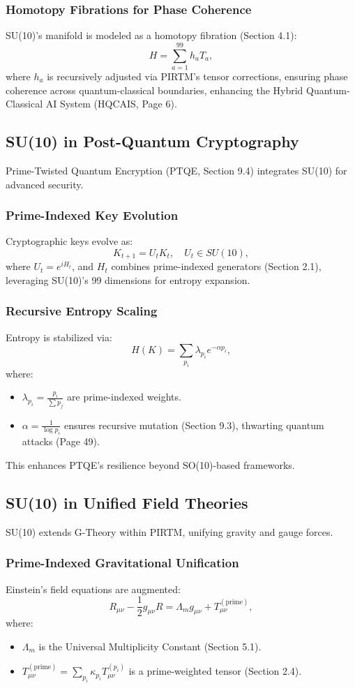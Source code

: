 \documentclass{article}
\theoremstyle{plain}
\begin{document}
\subsubsection{Homotopy Fibrations for Phase Coherence}
SU(10)’s manifold is modeled as a homotopy fibration (Section 4.1):
\[
H = \sum_{a=1}^{99} h_a T_a,
\]
where \( h_a \) is recursively adjusted via PIRTM’s tensor corrections, ensuring phase coherence across quantum-classical boundaries, enhancing the Hybrid Quantum-Classical AI System (HQCAIS, Page 6).

\subsection{SU(10) in Post-Quantum Cryptography}

Prime-Twisted Quantum Encryption (PTQE, Section 9.4) integrates SU(10) for advanced security.

\subsubsection{Prime-Indexed Key Evolution}
Cryptographic keys evolve as:
\[
K_{t+1} = U_t K_t, \quad U_t \in SU(10),
\]
where \( U_t = e^{i H_t} \), and \( H_t \) combines prime-indexed generators (Section 2.1), leveraging SU(10)’s 99 dimensions for entropy expansion.

\subsubsection{Recursive Entropy Scaling}
Entropy is stabilized via:
\[
H(K) = \sum_{p_i} \lambda_{p_i} e^{-\alpha p_i},
\]
where:
\begin{itemize}
    \item \( \lambda_{p_i} = \frac{p_i}{\sum p_j} \) are prime-indexed weights.
    \item \( \alpha = \frac{1}{\log p_i} \) ensures recursive mutation (Section 9.3), thwarting quantum attacks (Page 49).
\end{itemize}
This enhances PTQE’s resilience beyond SO(10)-based frameworks.

\subsection{SU(10) in Unified Field Theories}

SU(10) extends G-Theory within PIRTM, unifying gravity and gauge forces.

\subsubsection{Prime-Indexed Gravitational Unification}
Einstein’s field equations are augmented:
\[
R_{\mu\nu} - \frac{1}{2} g_{\mu\nu} R = \Lambda_m g_{\mu\nu} + T_{\mu\nu}^{(\text{prime})},
\]
where:
\begin{itemize}
    \item \( \Lambda_m \) is the Universal Multiplicity Constant (Section 5.1).
    \item \( T_{\mu\nu}^{(\text{prime})} = \sum_{p_i} \kappa_{p_i} T_{\mu\nu}^{(p_i)} \) is a prime-weighted tensor (Section 2.4).
\end{itemize}
\end{document}
